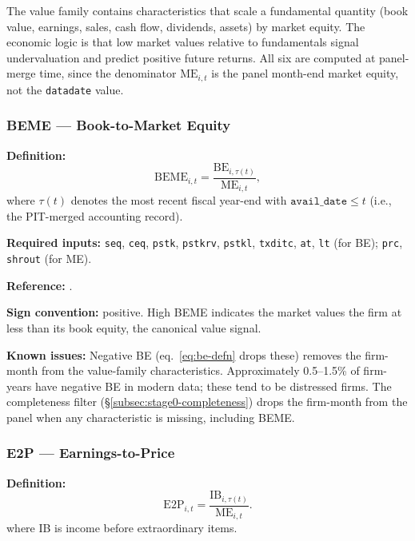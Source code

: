 The value family contains characteristics that scale a fundamental
quantity (book value, earnings, sales, cash flow, dividends, assets) by
market equity. The economic logic is that low market values relative to
fundamentals signal undervaluation and predict positive future returns.
All six are computed at panel-merge time, since the denominator
$\mathrm{ME}_{i,t}$ is the panel month-end market equity, not the
\texttt{datadate} value.

\subsubsection{BEME --- Book-to-Market Equity}

\textbf{Definition:}
\begin{equation}
\mathrm{BEME}_{i,t} = \frac{\mathrm{BE}_{i,\tau(t)}}{\mathrm{ME}_{i,t}},
\label{eq:beme}
\end{equation}
where $\tau(t)$ denotes the most recent fiscal year-end with
$\texttt{avail\_date} \le t$ (i.e., the PIT-merged accounting record).

\textbf{Required inputs:}
\texttt{seq}, \texttt{ceq}, \texttt{pstk}, \texttt{pstkrv},
\texttt{pstkl}, \texttt{txditc}, \texttt{at}, \texttt{lt} (for BE);
\texttt{prc}, \texttt{shrout} (for ME).

\textbf{Reference:} \cite{FamaFrench1992,FamaFrench1993}.

\textbf{Sign convention:} positive. High BEME indicates the market
values the firm at less than its book equity, the canonical value
signal.

\textbf{Known issues:} Negative BE (eq.~\ref{eq:be-defn} drops these)
removes the firm-month from the value-family characteristics. Approximately
0.5--1.5\% of firm-years have negative BE in modern data; these tend to
be distressed firms. The completeness filter
(\S\ref{subsec:stage0-completeness}) drops the firm-month from the
panel when any characteristic is missing, including BEME.

\subsubsection{E2P --- Earnings-to-Price}

\textbf{Definition:}
\begin{equation}
\mathrm{E2P}_{i,t} = \frac{\mathrm{IB}_{i,\tau(t)}}{\mathrm{ME}_{i,t}}.
\label{eq:e2p}
\end{equation}
where IB is income before extraordinary items.

